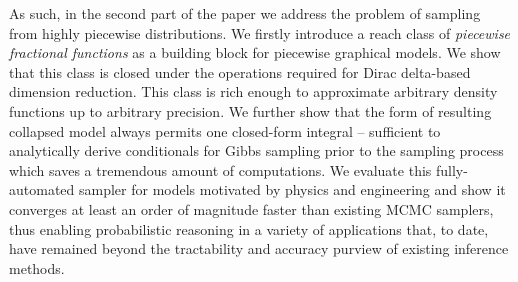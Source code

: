 As such, in the second part of the paper we address the problem of sampling from highly piecewise distributions. %
We firstly introduce a reach class of \emph{piecewise fractional functions} as a building block for piecewise graphical models.%
We show that this class is closed under the operations required for Dirac delta-based dimension reduction.
This class is rich enough to approximate arbitrary density functions up to arbitrary precision. 
We further show that the form of resulting collapsed model always permits one closed-form integral -- sufficient to analytically derive conditionals for Gibbs sampling prior to the sampling process which saves a tremendous amount of computations.
We evaluate this fully-automated sampler for models motivated by physics and engineering and show it converges at least an order of magnitude faster than existing MCMC samplers, thus enabling probabilistic reasoning in a variety of applications that, to date, have remained beyond the tractability and accuracy purview of existing inference methods.  




